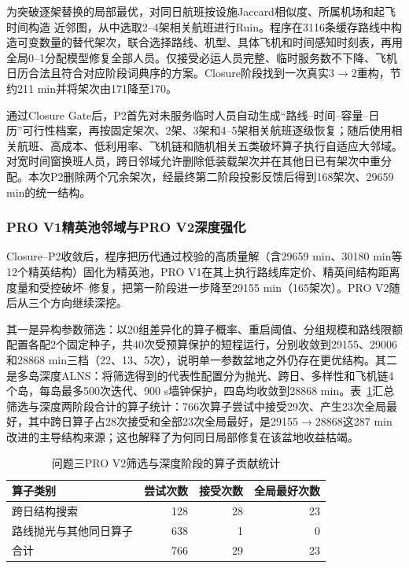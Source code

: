\documentclass[UTF8,a4paper,zihao=5]{ctexart}
\begin{document}
为突破逐架替换的局部最优，对同日航班按设施Jaccard相似度、所属机场和起飞时间构造
近邻图，从中选取2--4架相关航班进行Ruin。程序在3116条缓存路线中构造可变数量的替代架次，联合选择路线、机型、具体飞机和时间感知时刻表，再用全局0--1分配模型修复全部人员。仅接受必运人员完整、临时服务数不下降、飞机日历合法且符合对应阶段词典序的方案。Closure阶段找到一次真实$3\to2$重构，节约211 min并将架次由171降至170。

通过Closure Gate后，P2首先对未服务临时人员自动生成“路线--时间--容量--日历”可行性档案，再按固定架次、2架、3架和4--5架相关航班逐级恢复；随后使用相关航班、高成本、低利用率、飞机链和随机相关五类破坏算子执行自适应大邻域。对宽时间窗换班人员，跨日邻域允许删除低装载架次并在其他日已有架次中重分配。本次P2删除两个冗余架次，经最终第二阶段投影反馈后得到168架次、29659 min的统一结构。

\subsubsection{PRO V1精英池邻域与PRO V2深度强化}

Closure--P2收敛后，程序把历代通过校验的高质量解（含29659 min、30180 min等12个精英结构）固化为精英池，PRO V1在其上执行路线库定价、精英间结构距离度量和受控破坏--修复，把第一阶段进一步降至29155 min（165架次）。PRO V2随后从三个方向继续深挖。

其一是异构参数筛选：以20组差异化的算子概率、重启阈值、分组规模和路线限额配置各配2个固定种子，共40次受预算保护的短程运行，分别收敛到29155、29006和28868 min三档（22、13、5次），说明单一参数盆地之外仍存在更优结构。其二是多岛深度ALNS：将筛选得到的代表性配置分为抛光、跨日、多样性和飞机链4个岛，每岛最多500次迭代、900 s墙钟保护，四岛均收敛到28868 min。表~\ref{tab:q3-operator-v2}汇总筛选与深度两阶段合计的算子统计：766次算子尝试中接受29次、产生23次全局最好，其中跨日算子占28次接受和全部23次全局最好，是29155$\to$28868这287 min改进的主导结构来源；这也解释了为何同日局部修复在该盆地收益枯竭。

\begin{table}[htbp]
  \centering
  \caption{问题三PRO V2筛选与深度阶段的算子贡献统计}
  \label{tab:q3-operator-v2}
  \begin{tabular}{lrrr}
    \toprule
    算子类别 & 尝试次数 & 接受次数 & 全局最好次数 \\
    \midrule
    跨日结构搜索 & 128 & 28 & 23 \\
    路线抛光与其他同日算子 & 638 & 1 & 0 \\
    \midrule
    合计 & 766 & 29 & 23 \\
    \bottomrule
  \end{tabular}
\end{table}
\end{document}

